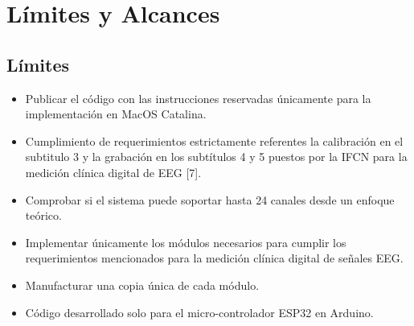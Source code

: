 \section{Límites y Alcances}
\label{sec:orgb1b8d20}
\subsection{Límites}
\label{sec:orgfecb326}
\begin{itemize}
\item Publicar el código con las instrucciones reservadas únicamente para la implementación en MacOS Catalina.\\
\item Cumplimiento de requerimientos estrictamente referentes la calibración en el subtitulo 3 y la grabación en los subtítulos 4 y 5 puestos por la IFCN para la medición clínica digital de EEG [7].\\
\item Comprobar si el sistema puede soportar hasta 24 canales desde un enfoque teórico.\\
\item Implementar únicamente los módulos necesarios para cumplir los requerimientos mencionados para la medición clínica digital de señales EEG.\\
\item Manufacturar una copia única de cada módulo.\\
\item Código desarrollado solo para el micro-controlador ESP32 en Arduino.\\
\end{itemize}

